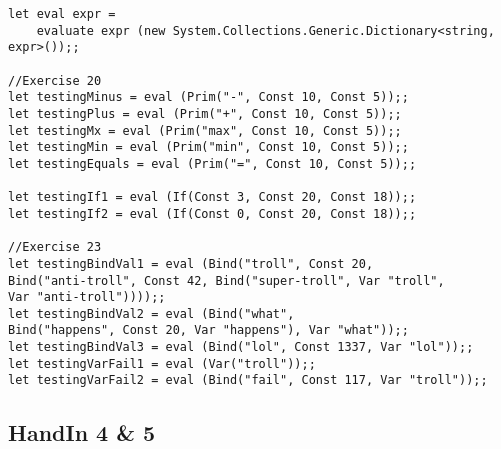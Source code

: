 \begin{lstlisting}
let eval expr =
    evaluate expr (new System.Collections.Generic.Dictionary<string, expr>());;

//Exercise 20
let testingMinus = eval (Prim("-", Const 10, Const 5));;
let testingPlus = eval (Prim("+", Const 10, Const 5));;
let testingMx = eval (Prim("max", Const 10, Const 5));;
let testingMin = eval (Prim("min", Const 10, Const 5));;
let testingEquals = eval (Prim("=", Const 10, Const 5));;

let testingIf1 = eval (If(Const 3, Const 20, Const 18));;
let testingIf2 = eval (If(Const 0, Const 20, Const 18));;

//Exercise 23
let testingBindVal1 = eval (Bind("troll", Const 20, 
Bind("anti-troll", Const 42, Bind("super-troll", Var "troll", 
Var "anti-troll"))));;
let testingBindVal2 = eval (Bind("what", 
Bind("happens", Const 20, Var "happens"), Var "what"));;
let testingBindVal3 = eval (Bind("lol", Const 1337, Var "lol"));;
let testingVarFail1 = eval (Var("troll"));;
let testingVarFail2 = eval (Bind("fail", Const 117, Var "troll"));;
\end{lstlisting}

\subsection{HandIn 4 \& 5}
\label{Appendix_FSharp_Grooss_4and5}
\begin{lstlisting}

\end{lstlisting}